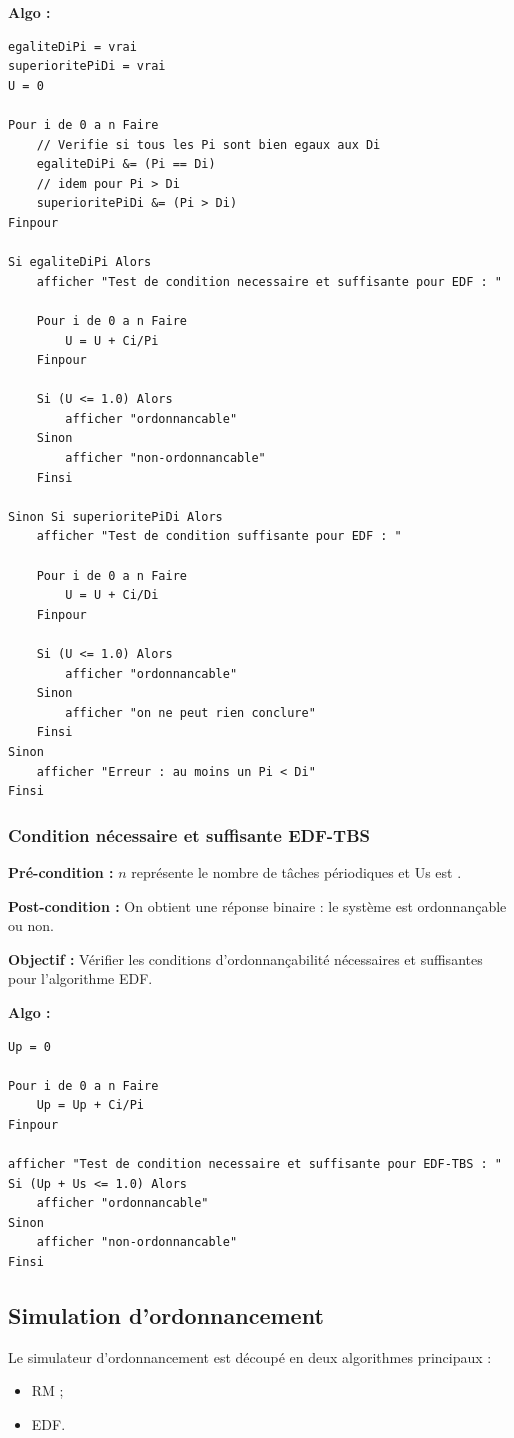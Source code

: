 				\textbf{Algo :} 
					\begin{lstlisting}[mathescape]
egaliteDiPi = vrai					
superioritePiDi = vrai
U = 0		
			
Pour i de 0 a n Faire
    // Verifie si tous les Pi sont bien egaux aux Di
	egaliteDiPi &= (Pi == Di) 
	// idem pour Pi > Di
	superioritePiDi &= (Pi > Di) 
Finpour

Si egaliteDiPi Alors
	afficher "Test de condition necessaire et suffisante pour EDF : "

    Pour i de 0 a n Faire
	    U = U + Ci/Pi
    Finpour
	
	Si (U <= 1.0) Alors
		afficher "ordonnancable"
	Sinon
		afficher "non-ordonnancable"
	Finsi
	
Sinon Si superioritePiDi Alors
	afficher "Test de condition suffisante pour EDF : "
    
    Pour i de 0 a n Faire
	    U = U + Ci/Di
    Finpour
	
	Si (U <= 1.0) Alors
		afficher "ordonnancable"
	Sinon
		afficher "on ne peut rien conclure"
	Finsi
Sinon
    afficher "Erreur : au moins un Pi < Di"
Finsi
					\end{lstlisting}
					
			\subsubsection{Condition nécessaire et suffisante EDF-TBS}
				\textbf{Pré-condition :} $n$ représente le nombre de tâches périodiques et Us est .
				
				\textbf{Post-condition :} On obtient une réponse binaire : le système est ordonnançable ou non.
				
				\textbf{Objectif :} Vérifier les conditions d'ordonnançabilité nécessaires et suffisantes pour l'algorithme EDF.
				
				\textbf{Algo :}
					\begin{lstlisting}
Up = 0

Pour i de 0 a n Faire
    Up = Up + Ci/Pi
Finpour
					
afficher "Test de condition necessaire et suffisante pour EDF-TBS : "
Si (Up + Us <= 1.0) Alors
	afficher "ordonnancable"
Sinon
	afficher "non-ordonnancable"
Finsi
					\end{lstlisting}
	
		\subsection{Simulation d'ordonnancement}
			Le simulateur d'ordonnancement est découpé en deux algorithmes principaux :
			\begin{itemize}
				\item RM ;
				\item EDF.
			\end{itemize}
			
